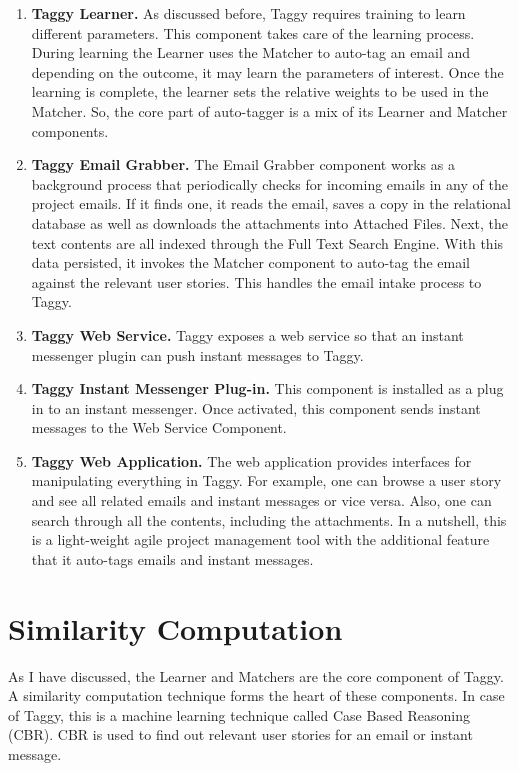 \begin{enumerate}
	\item \textbf{Taggy Learner.} As discussed before, Taggy requires training to learn different parameters. This component takes care of the learning process. During learning the Learner uses the Matcher to auto-tag an email and depending on the outcome, it may learn the parameters of interest. Once the learning is complete, the learner sets the relative weights to be used in the Matcher. So, the core part of auto-tagger is a mix of its Learner and Matcher components.
	
	\item \textbf{Taggy Email Grabber.} The Email Grabber component works as a background process that periodically checks for incoming emails in any of the project emails. If it finds one, it reads the email, saves a copy in the relational database as well as downloads the attachments into Attached Files. Next, the text contents are all indexed through the Full Text Search Engine. With this data persisted, it invokes the Matcher component to auto-tag the email against the relevant user stories. This handles the email intake process to Taggy.
	
	\item \textbf{Taggy Web Service.} Taggy exposes a web service so that an instant messenger plugin can push instant messages to Taggy.
	
	\item \textbf{Taggy Instant Messenger Plug-in.} This component is installed as a plug in to an instant messenger. Once activated, this component sends instant messages to the Web Service Component.
	
	\item \textbf{Taggy Web Application.} The web application provides interfaces for manipulating everything in Taggy. For example, one can browse a user story and see all related emails and instant messages or vice versa. Also, one can search through all the contents, including the attachments. In a nutshell, this is a light-weight agile project management tool with the additional feature that it auto-tags emails and instant messages.
\end{enumerate}

\section{Similarity Computation}
As I have discussed, the Learner and Matchers are the core component of Taggy. A similarity computation technique forms the heart of these components. In case of Taggy, this is a machine learning technique called Case Based Reasoning (CBR). CBR is used to find out relevant user stories for an email or instant message. 

